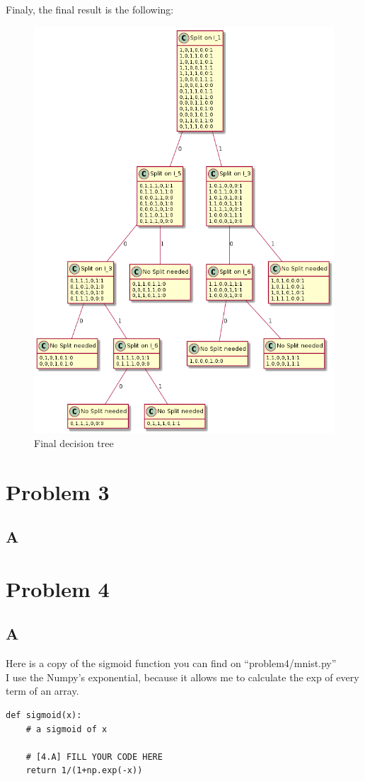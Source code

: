\documentclass{article}
\begin{document}
            Finaly, the final result is the following:
            \begin{figure}[H]
                \centering
                \includegraphics[scale=0.5]{problem2/graph.png}
                \caption{Final decision tree}
            \end{figure}


    \section{Problem 3}
        \subsection{A}
    \section{Problem 4}
        \subsection{A}
            Here is a copy of the sigmoid function you can find on ``problem4/mnist.py''\\
            I use the Numpy's exponential, because it allows me to calculate the exp of every term of an array.
            \begin{verbatim}
def sigmoid(x):
    # a sigmoid of x

    # [4.A] FILL YOUR CODE HERE
    return 1/(1+np.exp(-x))
            \end{verbatim}
\end{document}
